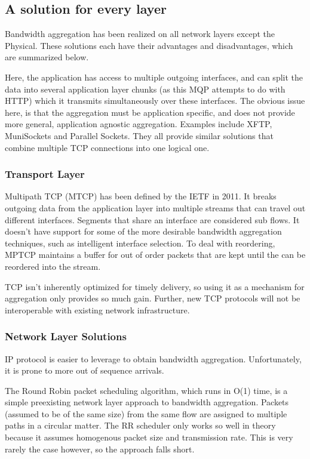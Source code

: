 \documentclass{article}
\begin{document}
\subsection{A solution for every layer}

Bandwidth aggregation has been realized on all network layers except the Physical. These solutions each have their advantages and disadvantages, which are summarized below.

Here, the application has access to multiple outgoing interfaces, and can split the data into several application layer chunks (as this MQP attempts to do with HTTP) which it transmits simultaneously over these interfaces. The obvious issue here, is that the aggregation must be application specific, and does not provide more general, application agnostic aggregation. Examples include XFTP, MuniSockets and Parallel Sockets. They all provide similar solutions that combine multiple TCP connections into one logical one.

\subsubsection{Transport Layer}
Multipath TCP (MTCP) has been defined by the IETF in 2011. It breaks outgoing data from the application layer into multiple streams that can travel out different interfaces. Segments that share an interface are considered sub flows. It doesn't have support for some of the more desirable bandwidth aggregation techniques, such as intelligent interface selection. To deal with reordering, MPTCP maintains a buffer for out of order packets that are kept until the can be reordered into the stream. 

TCP isn't inherently optimized for timely delivery, so using it as a mechanism for aggregation only provides so much gain. Further, new TCP protocols will not be interoperable with existing network infrastructure. 

\subsubsection{Network Layer Solutions}

IP protocol is easier to leverage to obtain bandwidth aggregation. Unfortunately, it is prone to more out of sequence arrivals.

The Round Robin packet scheduling algorithm, which runs in O(1) time, is a simple preexisting network layer approach to bandwidth aggregation. Packets (assumed to be of the same size) from the same flow are assigned to multiple paths in a circular matter. The RR scheduler only works so well in theory because it assumes homogenous packet size and transmission rate. This is very rarely the case however, so the approach falls short.
\end{document}
